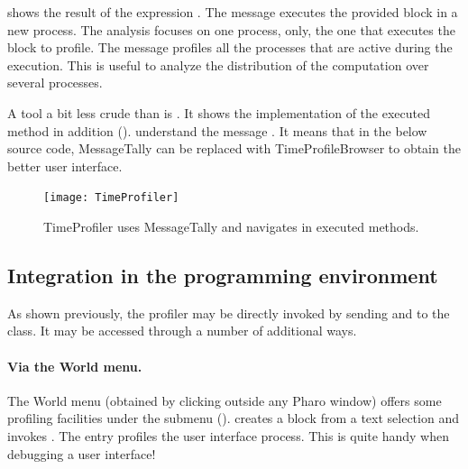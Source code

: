 \documentclass[a4paper,10pt,twoside]{book}
\begin{document}
 shows the result of the expression .
The message  executes the provided block in a new process. The analysis focuses on one process, only, the one that executes the block to profile. The message  profiles all the processes that are active during the execution. This is useful to analyze the distribution of the computation over several processes.


A tool a bit less crude than  is . It shows the implementation of the executed method in addition ().   understand the message . It means that in the below source code, MessageTally can be replaced with TimeProfileBrowser to obtain the better user interface.

\begin{figure}
	\begin{center}
	\texttt{[image: TimeProfiler]}
	\caption{TimeProfiler uses MessageTally and navigates in executed methods.
}
	\end{center}
\end{figure}


\subsection{Integration in the programming environment}
As shown previously, the profiler may be directly invoked by sending  and  to the  class. It may be accessed through a number of additional ways.

\paragraph{Via the World menu.}
The World menu (obtained by clicking outside any Pharo window) offers some profiling facilities under the  submenu ().  creates a block from a text selection and invokes . The entry  profiles the user interface process. This is quite handy when debugging a user interface!
\end{document}
